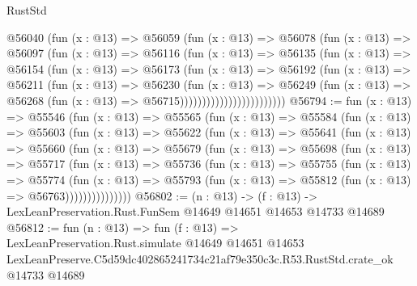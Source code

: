 \begin{lexlean}{RustStd}
\begin{coremodule}
                        @56040
                          (fun (x : @13) =>
                          @56059
                            (fun (x : @13) =>
                            @56078
                              (fun (x : @13) =>
                              @56097
                                (fun (x : @13) =>
                                @56116
                                  (fun (x : @13) =>
                                  @56135
                                    (fun (x : @13) =>
                                    @56154
                                      (fun (x : @13) =>
                                      @56173
                                        (fun (x : @13) =>
                                        @56192
                                          (fun (x : @13) =>
                                          @56211
                                            (fun (x : @13) =>
                                            @56230
                                              (fun (x : @13) =>
                                              @56249
                                                (fun (x : @13) =>
                                                @56268
                                                  (fun (x : @13) => @56715))))))))))))))))))))))))
@56794 := fun (x : @13) =>
  @55546
    (fun (x : @13) =>
    @55565
      (fun (x : @13) =>
      @55584
        (fun (x : @13) =>
        @55603
          (fun (x : @13) =>
          @55622
            (fun (x : @13) =>
            @55641
              (fun (x : @13) =>
              @55660
                (fun (x : @13) =>
                @55679
                  (fun (x : @13) =>
                  @55698
                    (fun (x : @13) =>
                    @55717
                      (fun (x : @13) =>
                      @55736
                        (fun (x : @13) =>
                        @55755
                          (fun (x : @13) =>
                          @55774
                            (fun (x : @13) =>
                            @55793 (fun (x : @13) => @55812 (fun (x : @13) => @56763)))))))))))))))
@56802 := (n : @13) ->
  (f : @13) -> LexLeanPreservation.Rust.FunSem @14649 @14651 @14653 @14733 @14689
@56812 := fun (n : @13) =>
  fun (f : @13) =>
  LexLeanPreservation.Rust.simulate
    @14649
    @14651
    @14653
    LexLeanPreserve.C5d59dc402865241734c21af79e350c3c.R53.RustStd.crate_ok
    @14733
    @14689
\end{coremodule}
\end{lexlean}
